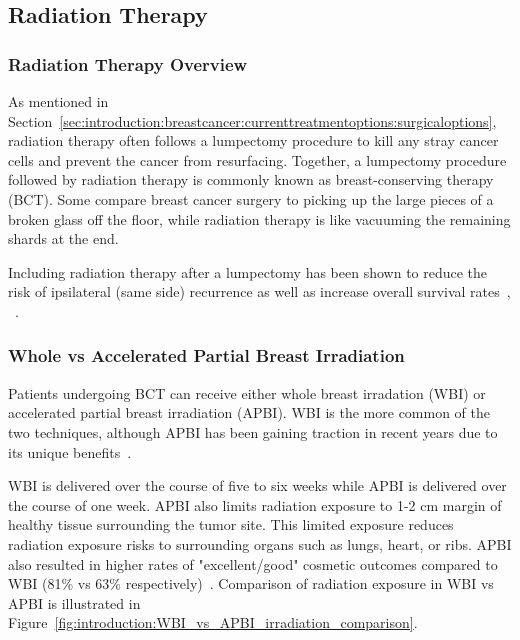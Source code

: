\subsection{Radiation Therapy\label{sec:introduction:radiationtherapy}}
\subsubsection{Radiation Therapy Overview\label{sec:introduction:radiationtherapy:overview}}
As mentioned in Section~\ref{sec:introduction:breastcancer:currenttreatmentoptions:surgicaloptions}, radiation therapy often follows a lumpectomy procedure to kill any stray cancer cells and prevent the cancer from resurfacing. Together, a lumpectomy procedure followed by radiation therapy is commonly known as breast-conserving therapy (BCT). Some compare breast cancer surgery to picking up the large pieces of a broken glass off the floor, while radiation therapy is like vacuuming the remaining shards at the end.

Including radiation therapy after a lumpectomy has been shown to reduce the risk of ipsilateral (same side) recurrence as well as increase overall survival rates~\cite{RefWorks:RefID:157-thomasscience}, ~\cite{RefWorks:RefID:198-jiao2024interobserver}.

\subsubsection{Whole vs Accelerated Partial Breast Irradiation\label{sec:introduction:radiationtherapy:wholevsacceleratedpartialbreastirradiation}}
Patients undergoing BCT can receive either whole breast irradation (WBI) or accelerated partial breast irradiation (APBI). WBI is the more common of the two techniques, although APBI has been gaining traction in recent years due to its unique benefits~\cite{RefWorks:RefID:157-thomasscience}.

WBI is delivered over the course of five to six weeks while APBI is delivered over the course of one week. APBI also limits radiation exposure to 1-2 cm margin of healthy tissue surrounding the tumor site. This limited exposure reduces radiation exposure risks to surrounding organs such as lungs, heart, or ribs. APBI also resulted in higher rates of "excellent/good" cosmetic outcomes compared to WBI (81\% vs 63\% respectively)~\cite{RefWorks:RefID:157-thomasscience}. Comparison of radiation exposure in WBI vs APBI is illustrated in Figure~\ref{fig:introduction:WBI_vs_APBI_irradiation_comparison}.

